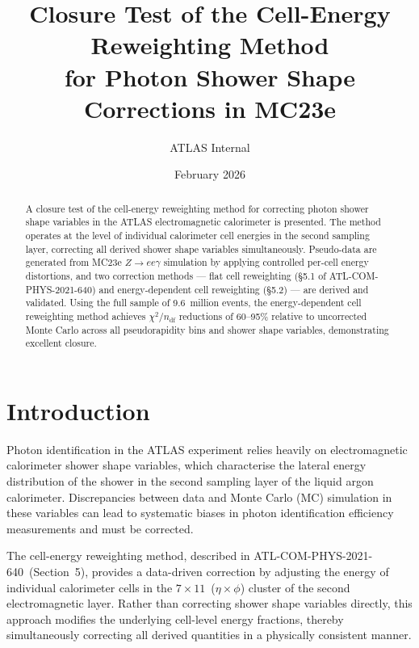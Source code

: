 \documentclass[12pt,a4paper]{article}
\title{%
  \textbf{Closure Test of the Cell-Energy Reweighting Method\\[4pt]
  for Photon Shower Shape Corrections in MC23e}
}
\author{ATLAS Internal}
\date{February 2026}
\begin{document}
\maketitle
\thispagestyle{fancy}

\begin{abstract}
\noindent
A closure test of the cell-energy reweighting method for correcting photon
shower shape variables in the ATLAS electromagnetic calorimeter is presented.
The method operates at the level of individual calorimeter cell energies in the
second sampling layer, correcting all derived shower shape variables
simultaneously. Pseudo-data are generated from MC23e $Z\to ee\gamma$
simulation by applying controlled per-cell energy distortions, and two
correction methods — flat cell reweighting
(§5.1 of ATL-COM-PHYS-2021-640) and energy-dependent cell reweighting
(§5.2) — are derived and validated. Using the full sample of 9.6~million
events, the energy-dependent cell reweighting method achieves $\chi^2/n_\text{df}$ reductions
of 60--95\% relative to uncorrected Monte Carlo across all pseudorapidity bins
and shower shape variables, demonstrating excellent closure.
\end{abstract}

\tableofcontents
\newpage

\section{Introduction}
\label{sec:introduction}

Photon identification in the ATLAS experiment relies heavily on
electromagnetic calorimeter shower shape variables, which characterise the
lateral energy distribution of the shower in the second sampling layer of the
liquid argon calorimeter. Discrepancies between data and Monte Carlo (MC)
simulation in these variables can lead to systematic biases in photon
identification efficiency measurements and must be corrected.

The cell-energy reweighting method, described in
ATL-COM-PHYS-2021-640~(Section~5), provides a data-driven correction by
adjusting the energy of individual calorimeter cells in the
$7\times 11$~($\eta\times\phi$) cluster of the second electromagnetic layer.
Rather than correcting shower shape variables directly, this approach modifies
the underlying cell-level energy fractions, thereby simultaneously correcting
all derived quantities in a physically consistent manner.
\end{document}

